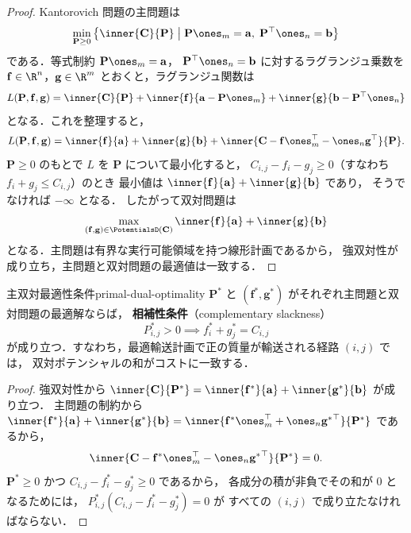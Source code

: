 \begin{proof}
  Kantorovich 問題の主問題は
  \[
    \min_{\mathbf{P} \geq 0} \left\{
    \inner{\mathbf{C}}{\mathbf{P}} \;\middle|\;
    \mathbf{P} \ones_m = \mathbf{a}, \;
    \mathbf{P}^\top \ones_n = \mathbf{b}
    \right\}
  \]
  である．等式制約 $\mathbf{P} \ones_m = \mathbf{a}$，
  $\mathbf{P}^\top \ones_n = \mathbf{b}$ に対するラグランジュ乗数を
  $\mathbf{f} \in \R^n$，$\mathbf{g} \in \R^m$ とおくと，ラグランジュ関数は
  \[
    L(\mathbf{P}, \mathbf{f}, \mathbf{g})
    = \inner{\mathbf{C}}{\mathbf{P}}
    + \inner{\mathbf{f}}{\mathbf{a} - \mathbf{P} \ones_m}
    + \inner{\mathbf{g}}{\mathbf{b} - \mathbf{P}^\top \ones_n}
  \]
  となる．これを整理すると，
  \[
    L(\mathbf{P}, \mathbf{f}, \mathbf{g})
    = \inner{\mathbf{f}}{\mathbf{a}} + \inner{\mathbf{g}}{\mathbf{b}}
    + \inner{\mathbf{C} - \mathbf{f} \ones_m^\top - \ones_n \mathbf{g}^\top}{\mathbf{P}}.
  \]
  $\mathbf{P} \geq 0$ のもとで $L$ を $\mathbf{P}$ について最小化すると，
  $C_{i,j} - f_i - g_j \geq 0$（すなわち $f_i + g_j \leq C_{i,j}$）のとき
  最小値は $\inner{\mathbf{f}}{\mathbf{a}} + \inner{\mathbf{g}}{\mathbf{b}}$ であり，
  そうでなければ $-\infty$ となる．
  したがって双対問題は
  \[
    \max_{(\mathbf{f}, \mathbf{g}) \in \PotentialsD(\mathbf{C})}
    \inner{\mathbf{f}}{\mathbf{a}} + \inner{\mathbf{g}}{\mathbf{b}}
  \]
  となる．主問題は有界な実行可能領域を持つ線形計画であるから，
  強双対性が成り立ち，主問題と双対問題の最適値は一致する．
\end{proof}

\begin{proposition}{主双対最適性条件}{primal-dual-optimality}
  $\mathbf{P}^*$ と $(\mathbf{f}^*, \mathbf{g}^*)$ がそれぞれ主問題と双対問題の最適解ならば，
  \textbf{相補性条件}（complementary slackness）
  \[
    P^*_{i,j} > 0 \implies f^*_i + g^*_j = C_{i,j}
  \]
  が成り立つ．すなわち，最適輸送計画で正の質量が輸送される経路 $(i, j)$ では，
  双対ポテンシャルの和がコストに一致する．
\end{proposition}

\begin{proof}
  強双対性から $\inner{\mathbf{C}}{\mathbf{P}^*}
  = \inner{\mathbf{f}^*}{\mathbf{a}} + \inner{\mathbf{g}^*}{\mathbf{b}}$ が成り立つ．
  主問題の制約から
  $\inner{\mathbf{f}^*}{\mathbf{a}} + \inner{\mathbf{g}^*}{\mathbf{b}}
  = \inner{\mathbf{f}^* \ones_m^\top + \ones_n {\mathbf{g}^*}^\top}{\mathbf{P}^*}$ であるから，
  \[
    \inner{\mathbf{C} - \mathbf{f}^* \ones_m^\top - \ones_n {\mathbf{g}^*}^\top}{\mathbf{P}^*} = 0.
  \]
  $\mathbf{P}^* \geq 0$ かつ $C_{i,j} - f^*_i - g^*_j \geq 0$ であるから，
  各成分の積が非負でその和が $0$ となるためには，
  $P^*_{i,j} (C_{i,j} - f^*_i - g^*_j) = 0$ が
  すべての $(i, j)$ で成り立たなければならない．
\end{proof}

